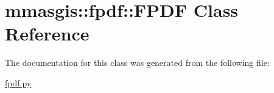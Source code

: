 \hypertarget{classmmasgis_1_1fpdf_1_1FPDF}{
\section{mmasgis::fpdf::FPDF Class Reference}
\label{classmmasgis_1_1fpdf_1_1FPDF}
}


The documentation for this class was generated from the following file:\begin{DoxyCompactItemize}
\item 
\hyperlink{fpdf_8py}{fpdf.py}\end{DoxyCompactItemize}
